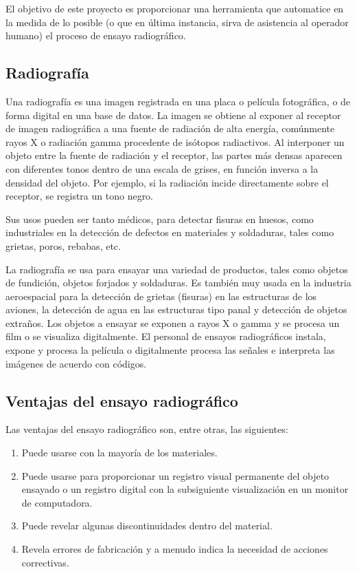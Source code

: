 El objetivo de este proyecto es proporcionar una herramienta que automatice en la medida de lo posible (o que en última instancia, sirva de asistencia al operador humano) el proceso de ensayo radiográfico.

\subsection{Radiografía}
Una radiografía \cite{wiki:Radiografia} es una imagen registrada en una placa o película fotográfica, o de forma digital en una base de datos. La imagen se obtiene al exponer al receptor de imagen radiográfica a una fuente de radiación de alta energía, comúnmente rayos X o radiación gamma procedente de isótopos radiactivos. Al interponer un objeto entre la fuente de radiación y el receptor, las partes más densas aparecen con diferentes tonos dentro de una escala de grises, en función inversa a la densidad del objeto. Por ejemplo, si la radiación incide directamente sobre el receptor, se registra un tono negro.

Sus usos pueden ser tanto médicos, para detectar fisuras en huesos, como industriales en la detección de defectos en materiales y soldaduras, tales como grietas, poros, rebabas, etc.

La radiografía se usa para ensayar una variedad de productos, tales como objetos de fundición, objetos forjados y soldaduras. Es también muy usada en la industria aeroespacial para la detección de grietas (fisuras) en las estructuras de los aviones, la detección de agua en las estructuras tipo panal y detección de objetos extraños. Los objetos a ensayar se exponen a rayos X o gamma y se procesa un film o se visualiza digitalmente. El personal de ensayos radiográficos instala, expone y procesa la película o digitalmente procesa las señales e interpreta las imágenes de acuerdo con códigos.

\subsection{Ventajas del ensayo radiográfico}
Las ventajas del ensayo radiográfico \cite{wiki:Radiografia} son, entre otras, las siguientes:

\begin{enumerate}
\item Puede usarse con la mayoría de los materiales.
\item Puede usarse para proporcionar un registro visual permanente del objeto ensayado o un registro digital con la subsiguiente visualización en un monitor de computadora.
\item Puede revelar algunas discontinuidades dentro del material.
\item Revela errores de fabricación y a menudo indica la necesidad de acciones correctivas.
\end{enumerate}

